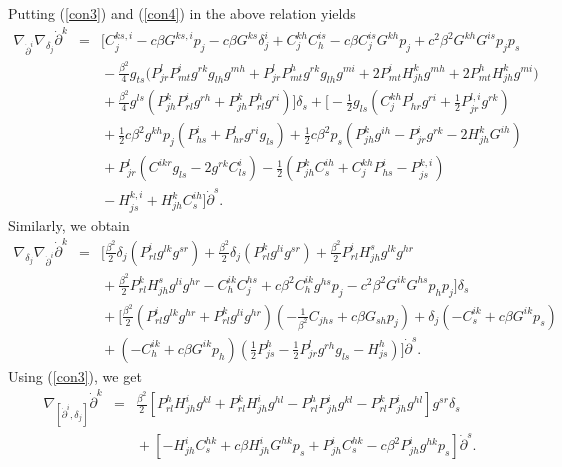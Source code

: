 \documentclass[10pt,a4paper]{article}
\theoremstyle{plain}
\theoremstyle{definition}
\begin{document}
Putting (\ref{con3}) and (\ref{con4}) in the above relation yields
\begin{eqnarray}
{\nabla }_{{\dot{\partial}}^i}{\nabla
}_{\delta_j}{\dot{\partial}}^k\!\!\!\!&=&\!\!\!\!\Big[C^{ks,i}_j-c\beta
G^{ks,i}p_j-c\beta G^{ks}\delta^i_j+C^{kh}_jC^{is}_h-c\beta
C^{is}_jG^{kh}p_j+c^2\beta ^2G^{kh}G^{is}p_jp_s\nonumber\\
\!\!\!\!&&\!\!\!\!-\frac{\beta
^2}{4}g_{ts}\big(P^l_{jr}P^i_{mt}g^{rk}g_{lh}g^{mh}+P^l_{jr}P^h_{mt}g^{rk}g_{lh}g^{mi}+2P^i_{mt}H^k_{jh}g^{mh}
+2P^h_{mt}H^k_{jh}g^{mi}\big)\nonumber\\
\!\!\!\!&&\!\!\!\!+\frac{\beta
^2}{4}g^{ls}(P^k_{jh}P^i_{rl}g^{rh}+P^k_{jh}P^h_{rl}g^{ri})\Big]\delta_s+
\Big[-\frac{1}{2}g_{ls}(C^{kh}_jP^l_{hr}g^{ri}+\frac{1}{2}P^{l,i}_{jr}g^{rk})\nonumber\\
\!\!\!\!&&\!\!\!\!+\frac{1}{2}c\beta^2g^{kh}p_j(P^i_{hs}+P^l_{hr}g^{ri}g_{ls})
+\frac{1}{2}c\beta^2p_s(P^k_{jh}g^{ih}-P^i_{jr}g^{rk}-2H^k_{jh}G^{ih}) \nonumber\\\!\!\!\!&&\!\!\!\!
+P^l_{jr}(C^{ikr}g_{ls}-2g^{rk}C^i_{ls})
-\frac{1}{2}(P^k_{jh}C^{ih}_s+C^{kh}_jP^i_{hs}-P^{k,i}_{js})\nonumber\\
\!\!\!\!&&\!\!\!\!  -H^{k,i}_{js}+H^k_{jh}C^{ih}_s\Big]{\dot{\partial}}^s.\label{Curvature9}
\end{eqnarray}
Similarly, we obtain
\begin{eqnarray}
{\nabla }_{\delta_j}{\nabla
}_{{\dot{\partial}}^i}{\dot{\partial}}^k\!\!\!\!&=&\!\!\!\!\Big[\frac{\beta
^2}{2}\delta _j(P^i_{rl}g^{lk}g^{sr})+\frac{\beta ^2}{2}\delta
_j(P^k_{rl}g^{li}g^{sr})+\frac{\beta
^2}{2}P^i_{rl}H^s_{jh}g^{lk}g^{hr}\nonumber\\\!\!\!\!&&\!\!\!\!
+\frac{\beta
^2}{2}P^k_{rl}H^s_{jh}g^{li}g^{hr}-C^{ik}_hC^{hs}_j+c\beta
^2C^{ik}_hg^{hs}p_j-c^2\beta ^2G^{ik}G^{hs}p_hp_j\Big]\delta
_s\nonumber\\\!\!\!\!&&\!\!\!\! +\Big[\frac{\beta
^2}{2}(P^i_{rl}g^{lk}g^{hr}+P^k_{rl}g^{li}g^{hr})(-\frac{1}{\beta^2}C_{jhs}+c\beta
G_{sh}p_j)+\delta_j(-C^{ik}_s+c\beta
G^{ik}p_s)\nonumber\\\!\!\!\!&&\!\!\!\!+(-C^{ik}_h+c\beta
G^{ik}p_h)(\frac{1}{2}P^h_{js}-\frac{1}{2}P^l_{jr}g^{rh}g_{ls}-H^h_{js})\Big]{\dot{\partial}}^s.\label{Curvature10}
\end{eqnarray}
Using (\ref{con3}), we get
\begin{eqnarray}
\nabla_{[{\dot{\partial}}^i,\delta_j]}{\dot{\partial}}^k\!\!\!\!&=&\!\!\!\!\frac{\beta^2}{2}[P^h_{rl}H^i_{jh}g^{kl}+P^k_{rl}H^i_{jh}g^{hl}
-P^h_{rl}P^i_{jh}g^{kl}-P^k_{rl}P^i_{jh}g^{hl}]g^{sr}\delta_s\nonumber\\
\!\!\!\!&&\!\!\!\!+[-H^i_{jh}C^{hk}_s+c\beta
H^i_{jh}G^{hk}p_s+P^i_{jh}C^{hk}_s-c\beta^2
P^i_{jh}g^{hk}p_s]{\dot{\partial}}^s.\label{Curvature11}
\end{eqnarray}
\end{document}
